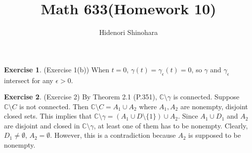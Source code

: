 \documentclass[12pt, psamsfonts]{amsart}
\theoremstyle{definition}
\newtheorem*{exer}{Exercise}
\theoremstyle{remark}
\numberwithin{equation}{section}
\begin{document}
\title{Math 633(Homework 10)}
\author{Hidenori Shinohara}
\maketitle

\begin{exer}{(Exercise 1(b))}
  When $t = 0$, $\gamma(t) = \gamma_{\epsilon}(t) = 0$, so $\gamma$ and $\gamma_{\epsilon}$ intersect for any $\epsilon > 0$.
\end{exer}

\begin{exer}{(Exercise 2)}
  By Theorem 2.1 (P.351), $\mathbb{C} \setminus \gamma$ is connected.
  Suppose $\mathbb{C} \setminus C$ is not connected.
  Then $\mathbb{C} \setminus C = A_1 \cup A_2$ where $A_1, A_2$ are nonempty, disjoint closed sets.
  This implies that $\mathbb{C} \setminus \gamma = (A_1 \cup D \setminus \{ 1 \}) \cup A_2$.
  Since $A_1 \cup D_1$ and $A_2$ are disjoint and closed in $\mathbb{C} \setminus \gamma$, at least one of them has to be nonempty.
  Clearly, $D_1 \ne \emptyset$, $A_2 = \emptyset$.
  However, this is a contradiction because $A_2$ is supposed to be nonempty.
\end{exer}
\end{document}
